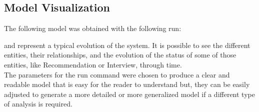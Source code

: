 

\subsection{Model Visualization}
The following model was obtained with the following run:


and represent a typical evolution of the system. It is possible to see the different entities, their relationships, and the evolution of the status of some of those entities, like Recommendation or Interview, through time.\\ 
The parameters for the run command were chosen to produce a clear and readable model that is easy for the reader to understand but, they can be easily adjusted to generate a more detailed or more generalized model if a different type of analysis is required.

